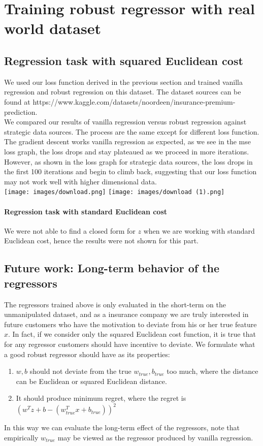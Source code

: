 \documentclass{article}
\begin{document}
\section{Training robust regressor with real world dataset}
\subsection{Regression task with squared Euclidean cost}
We used our loss function derived in the previous section and trained vanilla regression and robust regression on this dataset. The dataset sources can be found at https://www.kaggle.com/datasets/noordeen/insurance-premium-prediction.\\


\noindent We compared our results of vanilla regression versus robust regression against strategic data sources. The process are the same except for different loss function. The gradient descent works vanilla regression as expected, as we see in the mse loss graph, the loss drops and stay plateaued as we proceed in more iterations. However, as shown in the loss graph for strategic data sources, the loss drops in the first 100 iterations and begin to climb back, suggesting that our loss function may not work well with higher dimensional data.\\

\texttt{[image: images/download.png]}
\texttt{[image: images/download (1).png]}

\paragraph{Regression task with standard Euclidean cost } We were not able to find a closed form for $z$ when we are working with standard Euclidean cost, hence the results were not shown for this part.
\subsection{Future work: Long-term behavior of the regressors}
The regressors trained above is only evaluated in the short-term on the unmanipulated dataset, and as a insurance company we are truly interested in future customers who have the motivation to deviate from his or her true feature $x$. In fact, if we consider only the squared Euclidean cost function, it is true that for any regressor customers should have incentive to deviate. We formulate what a good robust regressor should have as its properties:
\begin{enumerate}
    \item $w,b$ should not deviate from the true $w_{true},b_{true}$ too much, where the distance can be Euclidean or squared Euclidean distance.
    \item It should produce minimum regret, where the regret is $(w^Tz + b - (w_{true}^Tx + b_{true}))^2$
\end{enumerate}
In this way we can evaluate the long-term effect of the regressors, note that empirically $w_{true}$ may be viewed as the regressor produced by vanilla regression.
\end{document}
